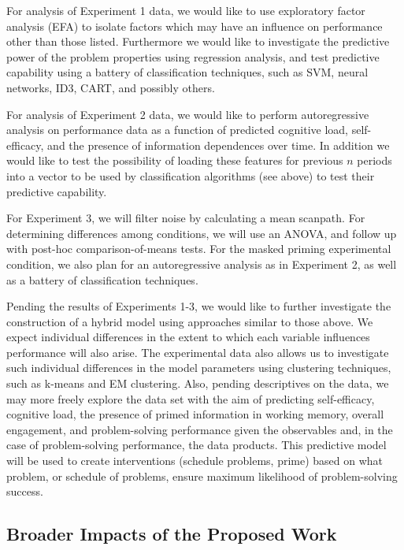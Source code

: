 \documentclass[hidelinks,11pt]{article}
\begin{document}
For analysis of Experiment 1 data, we would like to use exploratory factor
analysis (EFA) to isolate factors which may have an influence on performance
other than those listed. Furthermore we would like to investigate the
predictive power of the problem properties using regression analysis, and test
predictive capability using a battery of classification techniques, such as
SVM, neural networks, ID3, CART, and possibly others.

For analysis of Experiment 2 data, we would like to perform autoregressive
analysis on performance data as a function of predicted cognitive load,
self-efficacy, and the presence of information dependences over time. In
addition we would like to test the possibility of loading these features
for previous $n$ periods into a vector to be used by classification
algorithms (see above) to test their predictive capability.

For Experiment 3, we will filter noise by calculating a mean scanpath.  For
determining differences among conditions, we will use an ANOVA, and follow up
with post-hoc comparison-of-means tests. For the masked priming experimental
condition, we also plan for an autoregressive analysis as in Experiment 2,
as well as a battery of classification techniques.

Pending the results of Experiments 1-3, we would like to further investigate
the construction of a hybrid model using approaches similar to those above.  We
expect individual differences in the extent to which each variable influences
performance will also arise. The experimental data also allows us to
investigate such individual differences in the model parameters using
clustering techniques, such as k-means and EM clustering.  Also, pending
descriptives on the data, we may more freely explore the data set with the aim
of predicting self-efficacy, cognitive load, the presence of primed information
in working memory, overall engagement, and problem-solving performance given
the observables and, in the case of problem-solving performance, the data
products.  This predictive model will be used to create interventions (schedule
problems, prime) based on what problem, or schedule of problems, ensure maximum
likelihood of problem-solving success.

\subsection{ Broader Impacts of the Proposed Work } 
\end{document}
